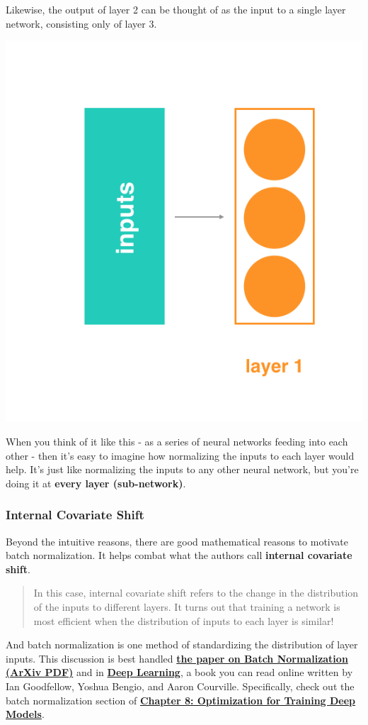 Likewise, the output of layer 2 can be thought of as the input to a single layer network, consisting only of layer 3.

\includegraphics[width=0.5\linewidth]{img//genAdvNet//deepGAN/one-layer.png}

When you think of it like this - as a series of neural networks feeding into each other - then it's easy to imagine how normalizing the inputs to each layer would help. It's just like normalizing the inputs to any other neural network, but you're doing it at \textbf{every layer (sub-network)}.

\subsubsection{Internal Covariate Shift}
Beyond the intuitive reasons, there are good mathematical reasons to motivate batch normalization. It helps combat what the authors call \textbf{internal covariate shift}.
\begin{quote}
In this case, internal covariate shift refers to the change in the distribution of the inputs to different layers. It turns out that training a network is most efficient when the distribution of inputs to each layer is similar!
\end{quote}
And batch normalization is one method of standardizing the distribution of layer inputs. This discussion is best handled \href{https://arxiv.org/pdf/1502.03167.pdf}{\textbf{the paper on Batch Normalization (ArXiv PDF)}} and in \href{http://www.deeplearningbook.org/}{\textbf{Deep Learning}}, a book you can read online written by Ian Goodfellow, Yoshua Bengio, and Aaron Courville. Specifically, check out the batch normalization section of \href{http://www.deeplearningbook.org/contents/optimization.html}{\textbf{Chapter 8: Optimization for Training Deep Models}}.

